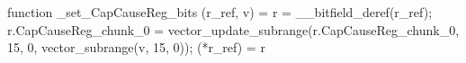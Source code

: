 function _set_CapCauseReg_bits (r_ref, v) = {
    r = __bitfield_deref(r_ref);
    r.CapCauseReg_chunk_0 = vector_update_subrange(r.CapCauseReg_chunk_0, 15, 0, vector_subrange(v, 15, 0));
    (*r_ref) = r
}
